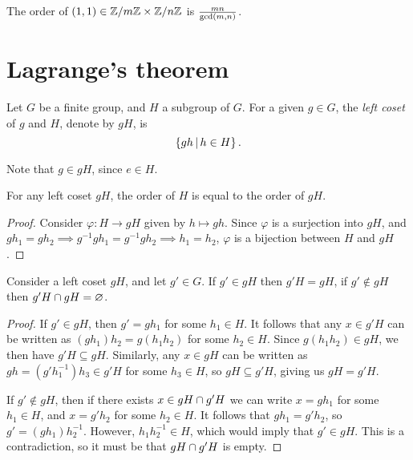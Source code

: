 \begin{cor}
    The order of $(1, 1) \in \mathbb{Z}/m\mathbb{Z} \times \mathbb{Z}/n\mathbb{Z}$ is $\frac{mn}{\operatorname{gcd}(m, n)}$.
\end{cor}

\section{Lagrange's theorem}

\begin{defn}
    Let $G$ be a finite group, and $H$ a subgroup of $G$. For a given $g \in G$, the \emph{left coset} of $g$ and $H$, denote by $gH$, is \[\left\{gh \,\middle|\, h \in H\right\}.\]
\end{defn}

\begin{rmk}
    Note that $g \in gH$, since $e \in H$.
\end{rmk}

\begin{prop}\label{coset-order}
    For any left coset $gH$, the order of $H$ is equal to the order of $gH$.
\end{prop}

\begin{proof}
    Consider $\varphi: H \to gH$ given by $h \mapsto gh$. Since $\varphi$ is a surjection into $gH$, and $gh_1 = gh_2 \implies g^{-1}gh_1 = g^{-1}gh_2 \implies h_1 = h_2$, $\varphi$ is a bijection between $H$ and $gH$.
\end{proof}

\begin{prop}\label{cosets-equal-or-disjoint}
    Consider a left coset $gH$, and let $g' \in G$. If $g' \in gH$ then $g'H = gH$, if $g' \notin gH$ then $g'H \cap gH = \varnothing$.
\end{prop}

\begin{proof}
    If $g' \in gH$, then $g' = gh_1$ for some $h_1 \in H$. It follows that any $x \in g'H$ can be written as $(gh_1)h_2 = g(h_1h_2)$ for some $h_2 \in H$. Since $g(h_1h_2) \in gH$, we then have $g'H \subseteq gH$. Similarly, any $x \in gH$ can be written as $gh = (g'h_1^{-1})h_3 \in g'H$ for some $h_3 \in H$, so $gH \subseteq g'H$, giving us $gH = g'H$.

    If $g' \notin gH$, then if there exists $x \in gH \cap g'H$ we can write $x = gh_1$ for some $h_1 \in H$, and $x = g'h_2$ for some $h_2 \in H$. It follows that $gh_1 = g'h_2$, so $g' = (gh_1)h_2^{-1}$. However, $h_1h_2^{-1} \in H$, which would imply that $g' \in gH$. This is a contradiction, so it must be that $gH \cap g'H$ is empty.
\end{proof}


